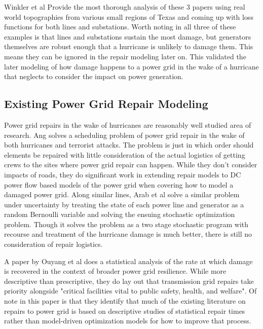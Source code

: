 \documentclass{article}
\begin{document}
		 Winkler et al \cite{WinklerEA2010} Provide the most thorough analysis of these 3 papers using real world topographies from various small regions of Texas and coming up with loss functions for both lines and substations. Worth noting in all three of these examples is that lines and substations sustain the most damage, but generators themselves are robust enough that a hurricane is unlikely to damage them. This means they can be ignored in the repair modeling later on. This validated the later modeling of how damage happens to a power grid in the wake of a hurricane that neglects to consider the impact on power generation.
	\subsection{Existing Power Grid Repair Modeling}
		Power grid repairs in the wake of hurricanes are reasonably well studied area of research. Ang \cite{NPSMasters} solves a scheduling problem of power grid repair in the wake of both hurricanes and terrorist attacks. The problem is just in which order should elements be repaired with little consideration of the actual logistics of getting crews to the sites where power grid repair can happen. While they don't consider impacts of roads, they do significant work in extending repair models to DC power flow based models of the power grid when covering how to model a damaged power grid. Along similar lines, Arab et al \cite{ArabEA2015} solve a similar problem under uncertainty by treating the state of each power line and generator as a random Bernoulli variable and solving the ensuing stochastic optimization problem. Though it solves the problem as a two stage stochastic program with recourse and treatment of the hurricane damage is much better, there is still no consideration of repair logistics. 
		
		A paper by Ouyang et al\cite{OuyangEA2014} does a statistical analysis of the rate at which damage is recovered in the context of broader power grid resilience. While more descriptive than prescriptive, they do lay out that transmission grid repairs take priority alongside "critical facilities vital to public safety, health, and welfare". Of note in this paper is that they identify that much of the existing literature on repairs to power grid is based on descriptive studies of statistical repair times rather than model-driven optimization models for how to improve that process.
		
\end{document}

